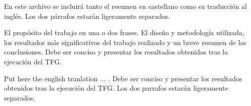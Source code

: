 En este archivo se incluirá tanto el resumen en castellano como su traducción al inglés. Los dos párrafos estarán ligeramente separados.

El  propósito  del  trabajo  en  una  o  dos  frases.  El  diseño  y metodología  utilizada,  los  resultados  más  significativos  del trabajo realizado y un breve resumen de las conclusiones. Debe ser conciso y presentar los resultados obtenidos tras la ejecución del TFG. 

\vspace{1.5cm}

Put here  the english tranlation  ... . Debe ser conciso y presentar los resultados obtenidos tras la ejecución del TFG. Los dos parrafos estarán ligeramente separados.